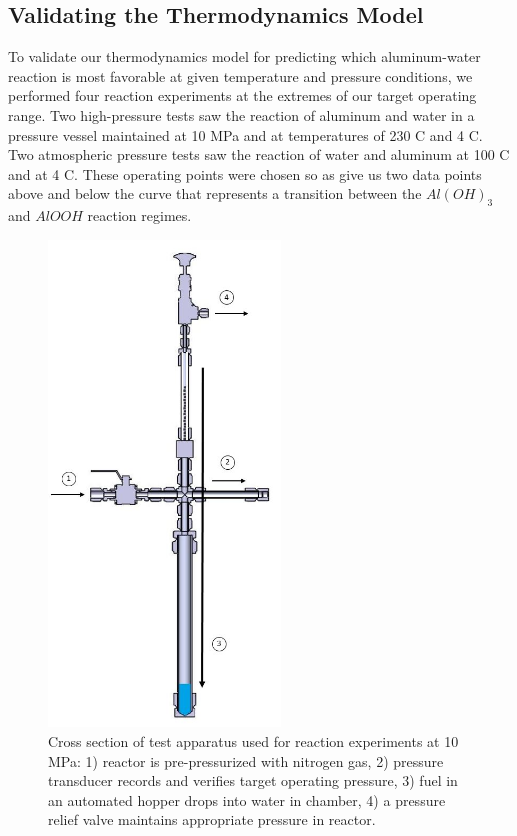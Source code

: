 \documentclass[preprint,12pt,3p]{elsarticle}
\begin{document}
\subsection{Validating the Thermodynamics Model}

To validate our thermodynamics model for predicting which aluminum-water
reaction is most favorable at given temperature and pressure conditions, we
performed four reaction experiments at the extremes of our target operating
range. Two high-pressure tests saw the reaction of aluminum and water in a
pressure vessel maintained at 10 MPa and at temperatures of 230 \textdegree C
and 4 \textdegree C. Two atmospheric pressure tests saw the reaction of water
and aluminum at 100 \textdegree C and at 4 \textdegree C. These operating points
were chosen so as give us two data points above and below the curve that
represents a transition between the $Al(OH)_3$ and $AlOOH$ reaction regimes.

\begin{figure}
  \centering
  \includegraphics[width=0.55\textwidth]{fig/hp_apparatus}
  \caption{Cross section of test apparatus used for reaction experiments at 10
  MPa: 1) reactor is pre-pressurized with nitrogen gas, 2) pressure transducer
records and verifies target operating pressure, 3) fuel in an automated hopper
drops into water in chamber, 4) a pressure relief valve maintains appropriate
pressure in reactor.}
  \label{fig:hp_apparatus}
\end{figure}
\end{document}
